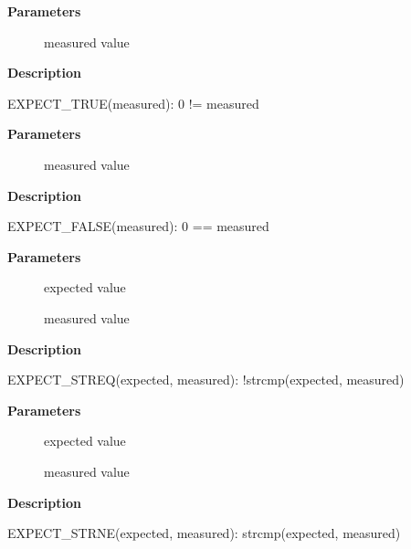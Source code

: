 \documentclass[a4paper,8pt,english]{sphinxmanual}
\begin{document}
\textbf{Parameters}
\begin{description}
\item[{}] \leavevmode
measured value

\end{description}

\textbf{Description}

EXPECT\_TRUE(measured): 0 != measured

\begin{fulllineitems}
\label{dev-tools/kselftest:c.EXPECT_FALSE}
\end{fulllineitems}


\textbf{Parameters}
\begin{description}
\item[{}] \leavevmode
measured value

\end{description}

\textbf{Description}

EXPECT\_FALSE(measured): 0 == measured

\begin{fulllineitems}
\label{dev-tools/kselftest:c.EXPECT_STREQ}
\end{fulllineitems}


\textbf{Parameters}
\begin{description}
\item[{}] \leavevmode
expected value

\item[{}] \leavevmode
measured value

\end{description}

\textbf{Description}

EXPECT\_STREQ(expected, measured): !strcmp(expected, measured)

\begin{fulllineitems}
\label{dev-tools/kselftest:c.EXPECT_STRNE}
\end{fulllineitems}


\textbf{Parameters}
\begin{description}
\item[{}] \leavevmode
expected value

\item[{}] \leavevmode
measured value

\end{description}

\textbf{Description}

EXPECT\_STRNE(expected, measured): strcmp(expected, measured)



\renewcommand{\indexname}{Index}
\printindex
\end{document}
